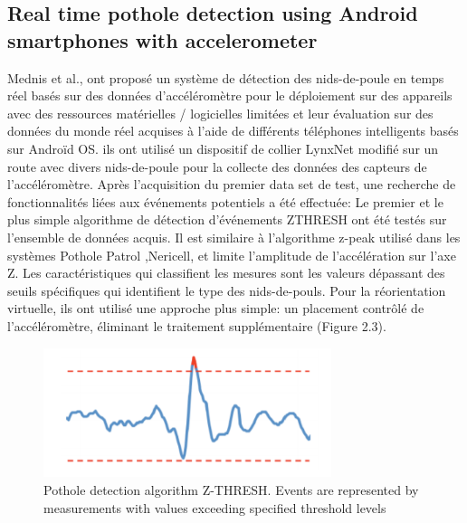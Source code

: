   \subsection{Real time pothole detection using Android smartphones with accelerometer}
  Mednis et al., ont proposé un système de détection des nids-de-poule en temps réel basés sur des données d'accéléromètre pour le déploiement sur des appareils avec des ressources matérielles / logicielles limitées et leur évaluation sur des données du monde réel acquises à l'aide de différents téléphones intelligents basés sur Androïd OS. \newline
  ils ont utilisé un dispositif de collier LynxNet modifié \cite{PDFLynxNetWild} sur un route avec divers nids-de-poule pour la collecte des données des capteurs de l'accéléromètre.\newline 
  Après l'acquisition du premier data set de test, une recherche de fonctionnalités liées aux événements potentiels a été effectuée:\newline
  Le premier et le plus simple algorithme de détection d'événements ZTHRESH ont été testés sur l'ensemble de données acquis. Il est similaire à l'algorithme z-peak utilisé dans les systèmes Pothole Patrol \cite{PotholePatrolProceedings},Nericell\cite{mohanNericellUsingMobile2008}, et limite l'amplitude de l'accélération sur l'axe Z. Les caractéristiques qui classifient les mesures sont les valeurs dépassant des seuils spécifiques qui identifient le type des nids-de-pouls. \newline
  Pour la réorientation virtuelle, ils ont utilisé une approche plus simple: un placement contrôlé de l'accéléromètre, éliminant le traitement supplémentaire (Figure 2.3).\newline
  \begin{figure}[h!]
    \center
    \includegraphics[width=0.75\textwidth]{Images/chapter2/relatedWork3.PNG}
   \caption{Pothole detection algorithm Z-THRESH. Events are represented by
   measurements with values exceeding specified threshold levels}
   \label{fig:graph}
    \end{figure}

